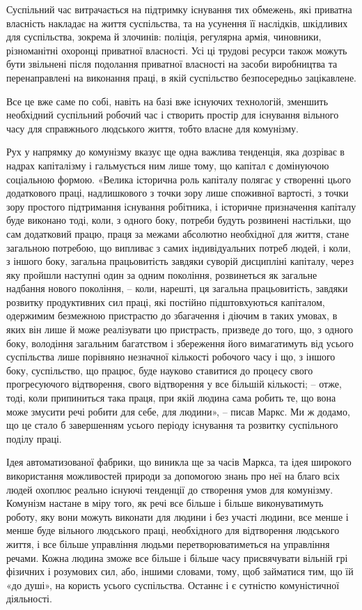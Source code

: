 \documentclass[12pt,a4paper,openany]{book}
\begin{document}
Суспільний час витрачається на підтримку існування тих обмежень, які приватна власність накладає на життя суспільства, та на усунення її наслідків, шкідливих для суспільства, зокрема й злочинів: поліція, регулярна армія, чиновники, різноманітні охоронці приватної власності. Усі ці трудові ресурси також можуть бути звільнені після подолання приватної власності на засоби виробництва та перенаправлені на виконання праці, в якій суспільство безпосередньо зацікавлене.

Все це вже саме по собі, навіть на базі вже існуючих технологій, зменшить необхідний суспільний робочий час і створить простір для існування вільного часу для справжнього людського життя, тобто власне для комунізму.

Рух у напрямку до комунізму вказує ще одна важлива тенденція, яка дозріває в надрах капіталізму і гальмується ним лише тому, що капітал є домінуючою соціальною формою. «Велика історична роль капіталу полягає у створенні цього додаткового праці, надлишкового з точки зору лише споживної вартості, з точки зору простого підтримання існування робітника, і історичне призначення капіталу буде виконано тоді, коли, з одного боку, потреби будуть розвинені настільки, що сам додатковий працю, праця за межами абсолютно необхідної для життя, стане загальною потребою, що випливає з самих індивідуальних потреб людей, і коли, з іншого боку, загальна працьовитість завдяки суворій дисципліні капіталу, через яку пройшли наступні один за одним покоління, розвинеться як загальне надбання нового покоління, – коли, нарешті, ця загальна працьовитість, завдяки розвитку продуктивних сил праці, які постійно підштовхуються капіталом, одержимим безмежною пристрастю до збагачення і діючим в таких умовах, в яких він лише й може реалізувати цю пристрасть, призведе до того, що, з одного боку, володіння загальним багатством і збереження його вимагатимуть від усього суспільства лише порівняно незначної кількості робочого часу і що, з іншого боку, суспільство, що працює, буде науково ставитися до процесу свого прогресуючого відтворення, свого відтворення у все більшій кількості; – отже, тоді, коли припиниться така праця, при якій людина сама робить те, що вона може змусити речі робити для себе, для людини», – писав Маркс. Ми ж додамо, що це стало б завершенням усього періоду існування та розвитку суспільного поділу праці.

Ідея автоматизованої фабрики, що виникла ще за часів Маркса, та ідея широкого використання можливостей природи за допомогою знань про неї на благо всіх людей охоплює реально існуючі тенденції до створення умов для комунізму. Комунізм настане в міру того, як речі все більше і більше виконуватимуть роботу, яку вони можуть виконати для людини і без участі людини, все менше і менше буде вільного людського праці, необхідного для відтворення людського життя, і все більше управління людьми перетворюватиметься на управління речами. Кожна людина зможе все більше і більше часу присвячувати вільній грі фізичних і розумових сил, або, іншими словами, тому, щоб займатися тим, що їй «до душі», на користь усього суспільства. Останнє і є сутністю комуністичної діяльності.
\end{document}
